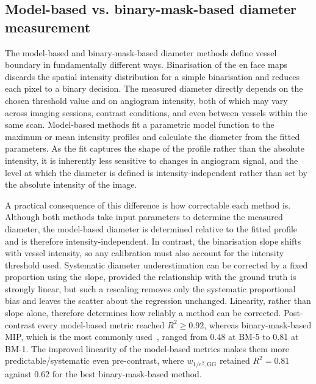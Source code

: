 \documentclass{optica-article}
\begin{document}
\subsection{Model-based vs. binary-mask-based diameter measurement}
\label{subsec:model_vs_binary}
The model-based and binary-mask-based diameter methods define vessel boundary in fundamentally different ways. Binarisation of the en face maps discards the spatial intensity distribution for a simple binarisation and reduces each pixel to a binary decision. The measured diameter directly depends on the chosen threshold value and on angiogram intensity, both of which may vary across imaging sessions, contrast conditions, and even between vessels within the same scan. Model-based methods fit a parametric model function to the maximum or mean intensity profiles and calculate the diameter from the fitted parameters. As the fit captures the shape of the profile rather than the absolute intensity, it is inherently less sensitive to changes in angiogram signal, and the level at which the diameter is defined is intensity-independent rather than set by the absolute intensity of the image.

A practical consequence of this difference is how correctable each method is. Although both methods take input parameters to determine the measured diameter, the model-based diameter is determined relative to the fitted profile and is therefore intensity-independent. In contrast, the binarisation slope shifts with vessel intensity, so any calibration must also account for the intensity threshold used. Systematic diameter underestimation can be corrected by a fixed proportion using the slope, provided the relationship with the ground truth is strongly linear, but such a rescaling removes only the systematic proportional bias and leaves the scatter about the regression unchanged. Linearity, rather than slope alone, therefore determines how reliably a method can be corrected. Post-contrast every model-based metric reached $R^2 \geq 0.92$, whereas binary-mask-based MIP, which is the most commonly used~\cite{sampsonTowardsStandardizingRetinal2022,untrachtTowardsStandardisingRetinal2024}, ranged from 0.48 at BM-5 to 0.81 at BM-1. The improved linearity of the model-based metrics makes them more predictable/systematic even pre-contrast, where $w_{1/e^2,\mathrm{GG}}$ retained $R^2 = 0.81$ against 0.62 for the best binary-mask-based method. 
\end{document}
